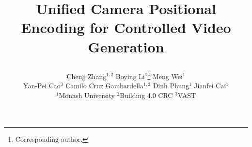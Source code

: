 \documentclass[10pt,twocolumn,letterpaper]{article}
\title{

    Unified Camera Positional Encoding for Controlled Video Generation
}
\author{
    Cheng Zhang$^{1,2}$ \quad
    Boying Li$^{1}$\thanks{Corresponding author.} \quad
    Meng Wei$^{1}$
    \\
    Yan-Pei Cao$^{3}$ \quad
    Camilo Cruz Gambardella$^{1,2}$ \quad
    Dinh Phung$^{1}$ \quad
    Jianfei Cai$^{1}$
    \\
    $^{1}$Monash University \quad
    $^{2}$Building 4.0 CRC \quad
    $^{3}$VAST
}
\begin{document}
\maketitle

    






{
    \small
    
    
}


\end{document}
